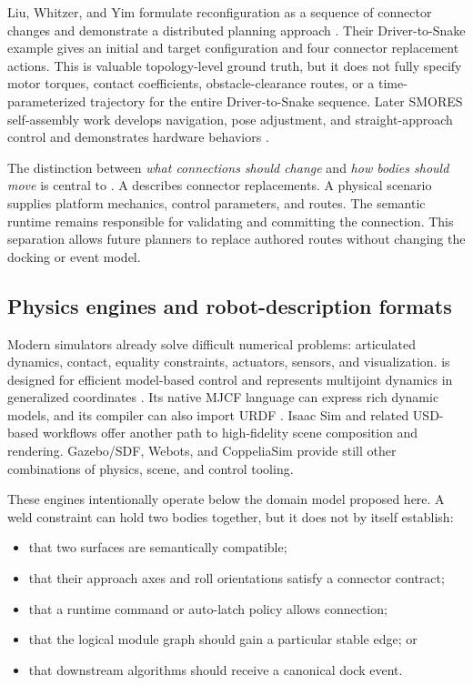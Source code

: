 Liu, Whitzer, and Yim formulate reconfiguration as a sequence of connector changes and
demonstrate a distributed planning approach \citep{liu2019distributed}. Their
Driver-to-Snake example gives an initial and target configuration and four connector
replacement actions. This is valuable topology-level ground truth, but it does not
fully specify motor torques, contact coefficients, obstacle-clearance routes, or a
time-parameterized trajectory for the entire Driver-to-Snake sequence. Later SMORES
self-assembly work develops navigation, pose adjustment, and straight-approach control
and demonstrates hardware behaviors \citep{liu2020parallel,liu2023smoresep}.

The distinction between \emph{what connections should change} and \emph{how bodies
should move} is central to \modsim{}. A  describes connector
replacements. A physical scenario supplies platform mechanics, control parameters, and
routes. The semantic runtime remains responsible for validating and committing the
connection. This separation allows future planners to replace authored routes without
changing the docking or event model.

\subsection{Physics engines and robot-description formats}

Modern simulators already solve difficult numerical problems: articulated dynamics,
contact, equality constraints, actuators, sensors, and visualization. \mujoco{} is
designed for efficient model-based control and represents multijoint dynamics in
generalized coordinates \citep{todorov2012mujoco}. Its native MJCF language can express
rich dynamic models, and its compiler can also import URDF
\citep{mujocoModelingDocs,urdfFormat}. Isaac Sim and related USD-based workflows offer
another path to high-fidelity scene composition and rendering. Gazebo/SDF, Webots, and
CoppeliaSim provide still other combinations of physics, scene, and control tooling.

These engines intentionally operate below the domain model proposed here. A weld
constraint can hold two bodies together, but it does not by itself establish:

\begin{itemize}
  \item that two surfaces are semantically compatible;
  \item that their approach axes and roll orientations satisfy a connector contract;
  \item that a runtime command or auto-latch policy allows connection;
  \item that the logical module graph should gain a particular stable edge; or
  \item that downstream algorithms should receive a canonical dock event.
\end{itemize}

